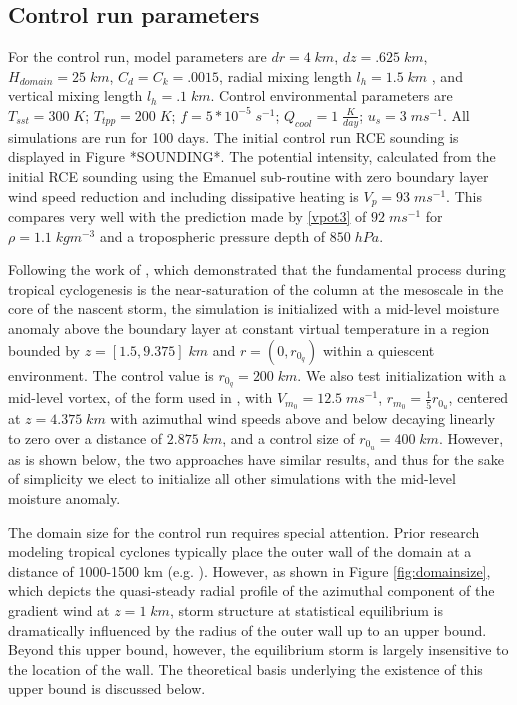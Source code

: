 \documentclass[12pt]{article}
\begin{document}
\subsection{Control run parameters}
For the control run, model parameters are $dr = 4 \; km$, $dz = .625 \; km$, $H_{domain} = 25 \; km$, $C_d = C_k = .0015$, radial mixing length $l_h = 1.5 \; km$ \citep{Bryan_Rotunno_2009b}, and vertical mixing length $l_h = .1 \; km$. Control environmental parameters are $T_{sst} = 300 \; K$; $T_{tpp} = 200 \; K$; $f = 5*10^{-5} \; s^{-1}$; $Q_{cool} = 1 \; \frac{K}{day}$; $u_s = 3 \; ms^{-1}$. All simulations are run for 100 days. The initial control run RCE sounding is displayed in Figure *SOUNDING*. The potential intensity, calculated from the initial RCE sounding using the Emanuel sub-routine with zero boundary layer wind speed reduction and including dissipative heating is $V_p = 93 \; ms^{-1}$.  This compares very well with the prediction made by \eqref{vpot3} of $92 \; ms^{-1}$ for $\rho =  1.1 \; kgm^{-3}$ and a tropospheric pressure depth of $850 \; hPa$.

Following the work of \cite{Bister_Emanuel_1997}, which demonstrated that the fundamental process during tropical cyclogenesis is the near-saturation of the column at the mesoscale in the core of the nascent storm, the simulation is initialized with a mid-level moisture anomaly above the boundary layer at constant virtual temperature in a region bounded by $z = [1.5, 9.375] \; km$ and $r = (0, r_{0_q})$ within a quiescent environment. The control value is $r_{0_q} = 200 \; km$.  We also test initialization with a mid-level vortex, of the form used in \cite{Rotunno_Emanuel_1987}, with $V_{m_0} = 12.5 \; ms^{-1}$, $r_{m_0} = \frac{1}{5} r_{0_u}$, centered at $z=4.375 \; km$ with azimuthal wind speeds above and below decaying linearly to zero over a distance of $2.875 \; km$, and a control size of $r_{0_u} = 400 \; km$. However, as is shown below, the two approaches have similar results, and thus for the sake of simplicity we elect to initialize all other simulations with the mid-level moisture anomaly.

The domain size for the control run requires special attention. Prior research modeling tropical cyclones typically place the outer wall of the domain at a distance of 1000-1500 km (e.g. \cite{Rotunno_Emanuel_1987, Hakim_2011}).  However, as shown in Figure \ref{fig:domainsize}, which depicts the quasi-steady radial profile of the azimuthal component of the gradient wind at $z = 1 \; km$, storm structure at statistical equilibrium is dramatically influenced by the radius of the outer wall up to an upper bound. Beyond this upper bound, however, the equilibrium storm is largely insensitive to the location of the wall. The theoretical basis underlying the existence of this upper bound is discussed below.
\end{document}
